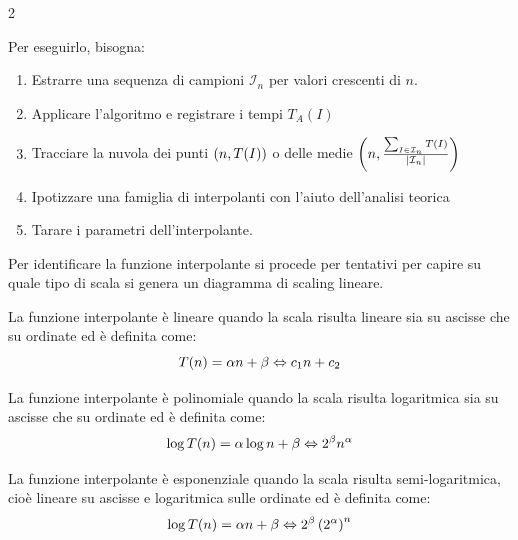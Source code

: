 \documentclass[\main/main.tex]{subfiles}
\begin{document}
\begin{multicols}{2}
\begin{definition}
    Per eseguirlo, bisogna:
    \begin{enumerate}
        \item Estrarre una sequenza di campioni \(\mathcal{I}_n\) per valori crescenti di \(n\).
        \item Applicare l'algoritmo e registrare i tempi \(T_A(I)\)
        \item Tracciare la nuvola dei punti \(\left(n, T(I)\right)\) o delle medie \(\left(n, \frac{\sum_{I\in \mathcal{I}_n} T(I)}{\left\lvert\mathcal{I}_n\right\rvert}\right)\)
        \item Ipotizzare una famiglia di interpolanti con l'aiuto dell'analisi teorica
        \item Tarare i parametri dell'interpolante.
    \end{enumerate}
\end{definition}
\begin{observation}
    Per identificare la funzione interpolante si procede per tentativi per capire su quale tipo di scala si genera un diagramma di scaling lineare.
\end{observation}
\begin{definition}
    La funzione interpolante è lineare quando la scala risulta lineare sia su ascisse che su ordinate ed è definita come:
    \[
        T(n) = \alpha n + \beta \Leftrightarrow c_1 n + c_2 
    \]
\end{definition}
\begin{definition}
    La funzione interpolante è polinomiale quando la scala risulta logaritmica sia su ascisse che su ordinate ed è definita come:
    \[
        \log T(n) = \alpha \log n + \beta \Leftrightarrow 2^\beta n^\alpha
    \]
\end{definition}
\begin{definition}
     La funzione interpolante è esponenziale quando la scala risulta semi-logaritmica, cioè lineare su ascisse e logaritmica sulle ordinate ed è definita come:
     \[
        \log T(n) = \alpha n + \beta \Leftrightarrow 2^\beta \left(2^\alpha\right)^n
    \]
\end{definition}
\end{multicols}
\end{document}
